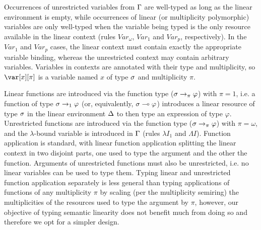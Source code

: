 \documentclass[acmsmall,review,screen]{acmart}
\newcommand{\lolli}{\multimap}
\newcommand{\ROUNDTWO}[1]{{\color{red}#1}}
\begin{document}
Occurrences of unrestricted variables from $\Gamma$ are well-typed as long as the linear
environment is empty, while occurrences of linear \ROUNDTWO{(or multiplicity polymorphic)} variables
are only well-typed
when the variable being typed is the only resource available in the
linear context (rules $Var_\omega$, $Var_1$ \ROUNDTWO{and $Var_p$}, respectively).
In \ROUNDTWO{the $Var_1$ and $Var_p$ cases}, the linear context must contain exactly \ROUNDTWO{the
  appropriate variable binding}, whereas the unrestricted context may contain arbitrary
variables.
%
Variables in contexts are annotated with their type and multiplicity, so
$\x[\pi]$ is a variable named $x$ of type $\sigma$ and multiplicity $\pi$.

Linear functions are introduced via the function type ($\sigma \to_\pi \varphi$) with
$\pi = 1$, i.e. a function of type $\sigma \to_1 \varphi$ (or, equivalently, $\s \lolli \vp$)
introduces a linear resource of type $\sigma$ in the linear environment $\Delta$ to then type an expression of type $\varphi$.
%
Unrestricted functions are introduced via the function type ($\sigma \to_\pi \varphi$) with $\pi =
\omega$, and the $\lambda$-bound variable is introduced in $\Gamma$ (rules
$\lambda I_1$ and $\Lambda I$). Function application is standard, with
linear function application splitting the linear context in two
disjoint parts, one used to type the argument and the other the
function.
Arguments of unrestricted functions must also be unrestricted, i.e. no
linear variables can be used to type them. 
%
Typing linear and unrestricted function application separately is less
general than typing applications of functions of any multiplicity
$\pi$ by scaling (per the multiplicity semiring) the multiplicities of
the resources used to type the argument by $\pi$, however, our
objective of typing semantic linearity does not benefit much from
doing so and therefore we opt for a simpler design.
\end{document}
